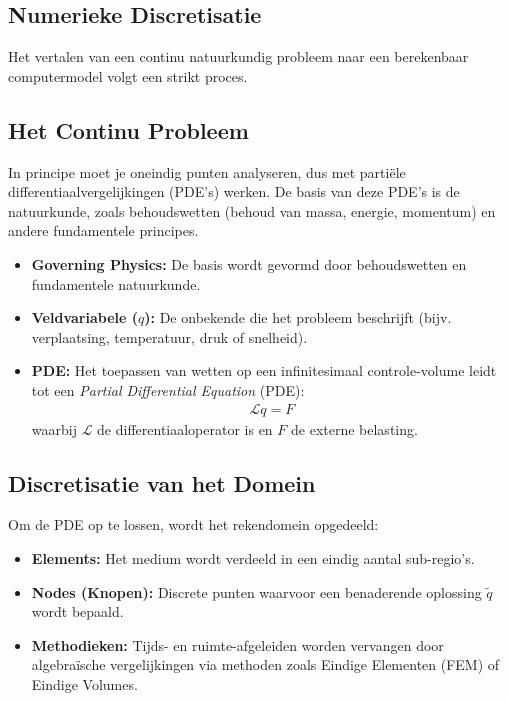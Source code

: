 \documentclass[a4paper,11pt,twoside]{report}
\begin{document}
\subsection{Numerieke Discretisatie}
Het vertalen van een continu natuurkundig probleem naar een berekenbaar computermodel volgt een
strikt proces.

\subsection*{Het Continu Probleem}
In principe moet je oneindig punten analyseren, dus met partiële differentiaalvergelijkingen (PDE's)
werken. De basis van deze PDE's is de natuurkunde, zoals behoudswetten (behoud van massa, energie,
momentum) en andere fundamentele principes.
\begin{itemize}
    \item \textbf{Governing Physics:} De basis wordt gevormd door behoudswetten en fundamentele
          natuurkunde.
    \item \textbf{Veldvariabele ($q$):} De onbekende die het probleem beschrijft (bijv.
          verplaatsing, temperatuur, druk of snelheid).
    \item \textbf{PDE:} Het toepassen van wetten op een infinitesimaal controle-volume leidt tot een
          \textit{Partial Differential Equation} (PDE):
          \begin{align*}
              \mathcal{L}q = F
          \end{align*}
          waarbij $\mathcal{L}$ de differentiaaloperator is en $F$ de externe belasting.
\end{itemize}

\subsection*{Discretisatie van het Domein}
Om de PDE op te lossen, wordt het rekendomein opgedeeld:
\begin{itemize}
    \item \textbf{Elements:} Het medium wordt verdeeld in een eindig aantal sub-regio's.
    \item \textbf{Nodes (Knopen):} Discrete punten waarvoor een benaderende oplossing $\tilde{q}$
          wordt bepaald.
    \item \textbf{Methodieken:} Tijds- en ruimte-afgeleiden worden vervangen door algebra\"ische
          vergelijkingen via methoden zoals Eindige Elementen (FEM) of Eindige Volumes.
\end{itemize}
\end{document}
